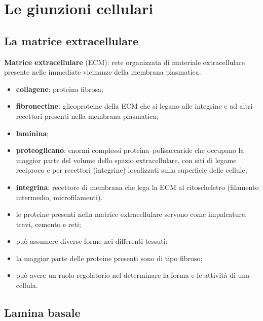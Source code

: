 \section{Le giunzioni cellulari}

\subsection{La matrice extracellulare}

\textbf{Matrice extracellulare} (ECM): rete organizzata di materiale extracellulare presente nelle immediate vicinanze della membrana plasmatica.

\begin{itemize}
  \item \textbf{collagene}: proteina fibrosa;
  \item \textbf{fibronectine}: glicoproteine della ECM che si legano alle integrine e ad altri recettori presenti nella membrana plasmatica;
  \item \textbf{laminina};
  \item \textbf{proteoglicano}: enormi complessi proteina--polisaccaride che occupano la maggior parte del volume dello spazio extracellulare, con siti di legame reciproco e per recettori (integrine) localizzati sulla superficie delle cellule;
  \item \textbf{integrina}: recettore di membrana che lega la ECM al citoscheletro (filamento intermedio, microfilamenti).
\end{itemize}

\begin{itemize}
  \item le proteine presenti nella matrice extracellulare servono come impalcature, travi, cemento e reti;
  \item può assumere diverse forme nei differenti tessuti;
  \item la maggior parte delle proteine presenti sono di tipo fibroso;
  \item può avere un ruolo regolatorio nel determinare la forma e le attività di una cellula.
\end{itemize}

\subsection{Lamina basale}

